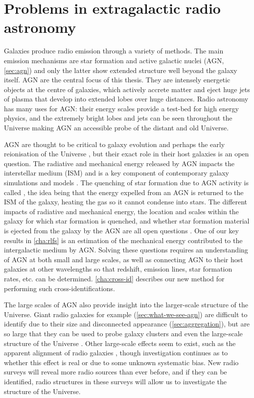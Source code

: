 \section{Problems in extragalactic radio astronomy}
\label{sec:problems-radio-astronomy}

    Galaxies produce radio emission through a variety of methods. The main emission mechanisms are star formation and active galactic nuclei (AGN, \autoref{sec:agn}) and only the latter show extended structure well beyond the galaxy itself. AGN are the central focus of this thesis. They are intensely energetic objects at the centre of galaxies, which actively accrete matter and eject huge jets of plasma that develop into extended lobes over huge distances. Radio astronomy has many uses for AGN: their energy scales provide a test-bed for high energy physics, and the extremely bright lobes and jets can be seen throughout the Universe making AGN an accessible probe of the distant and old Universe.

    AGN are thought to be critical to galaxy evolution and perhaps the early reionisation of the Universe \citep{bosch-ramon_role_2018}, but their exact role in their host galaxies is an open question. The radiative and mechanical energy released by AGN impacts the interstellar medium (ISM) and is a key component of contemporary galaxy simulations and models \citep{morganti_many_2017}. The quenching of star formation due to AGN activity is called , the idea being that the energy expelled from an AGN is returned to the ISM of the galaxy, heating the gas so it cannot condense into stars. The different impacts of radiative and mechanical energy, the location and scales within the galaxy for which star formation is quenched, and whether star formation material is ejected from the galaxy by the AGN are all open questions \citep{husemann_reality_2018}. One of our key results in \autoref{cha:rlfs} is an estimation of the mechanical energy contributed to the intergalactic medium by AGN. Solving these questions requires an understanding of AGN at both small and large scales, as well as connecting AGN to their host galaxies at other wavelengths so that redshift, emission lines, star formation rates, etc. can be determined. \autoref{cha:cross-id} describes our new method for performing such cross-identifications.

    The large scales of AGN also provide insight into the larger-scale structure of the Universe. Giant radio galaxies for example (\autoref{sec:what-we-see-agn}) are difficult to identify due to their size and disconnected appearance (\autoref{sec:aggregation}), but are so large that they can be used to probe galaxy clusters \citep{banfield_radio_2016} and even the large-scale structure of the Universe \citep{reiprich_abell_2020}. Other large-scale effects seem to exist, such as the apparent alignment of radio galaxies \citep{contigiani_radio_2017,panwar_alignment_2020}, though investigation continues as to whether this effect is real or due to some unknown systematic bias. New radio surveys will reveal more radio sources than ever before, and if they can be identified, radio structures in these surveys will allow us to investigate the structure of the Universe.

